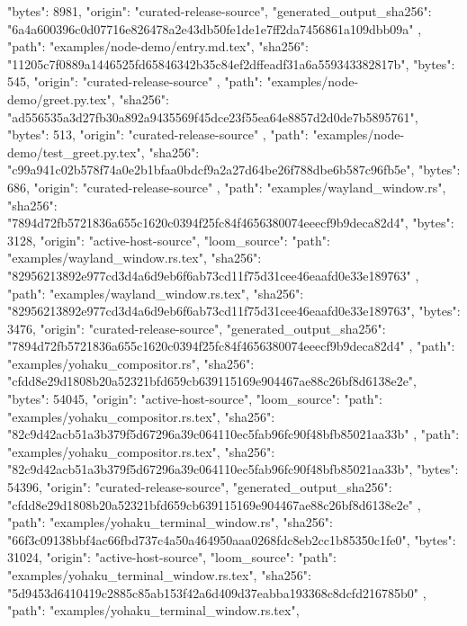 {{      "bytes": 8981,
      "origin": "curated-release-source",
      "generated_output_sha256": "6a4a600396c0d07716e826478a2e43db50fe1de1e7ff2da7456861a109dbb09a"
    },
    {
      "path": "examples/node-demo/entry.md.tex",
      "sha256": "11205c7f0889a1446525fd65846342b35c84ef2dffeadf31a6a559343382817b",
      "bytes": 545,
      "origin": "curated-release-source"
    },
    {
      "path": "examples/node-demo/greet.py.tex",
      "sha256": "ad556535a3d27fb30a892a9435569f45dce23f55ea64e8857d2d0de7b5895761",
      "bytes": 513,
      "origin": "curated-release-source"
    },
    {
      "path": "examples/node-demo/test_greet.py.tex",
      "sha256": "c99a941c02b578f74a0e2b1bfaa0bdcf9a2a27d64be26f788dbe6b587c96fb5e",
      "bytes": 686,
      "origin": "curated-release-source"
    },
    {
      "path": "examples/wayland_window.rs",
      "sha256": "7894d72fb5721836a655c1620c0394f25fc84f4656380074eeecf9b9deca82d4",
      "bytes": 3128,
      "origin": "active-host-source",
      "loom_source": {
        "path": "examples/wayland_window.rs.tex",
        "sha256": "82956213892e977cd3d4a6d9eb6f6ab73cd11f75d31cee46eaafd0e33e189763"
      }
    },
    {
      "path": "examples/wayland_window.rs.tex",
      "sha256": "82956213892e977cd3d4a6d9eb6f6ab73cd11f75d31cee46eaafd0e33e189763",
      "bytes": 3476,
      "origin": "curated-release-source",
      "generated_output_sha256": "7894d72fb5721836a655c1620c0394f25fc84f4656380074eeecf9b9deca82d4"
    },
    {
      "path": "examples/yohaku_compositor.rs",
      "sha256": "cfdd8e29d1808b20a52321bfd659cb639115169e904467ae88c26bf8d6138e2e",
      "bytes": 54045,
      "origin": "active-host-source",
      "loom_source": {
        "path": "examples/yohaku_compositor.rs.tex",
        "sha256": "82c9d42acb51a3b379f5d67296a39c064110ec5fab96fc90f48bfb85021aa33b"
      }
    },
    {
      "path": "examples/yohaku_compositor.rs.tex",
      "sha256": "82c9d42acb51a3b379f5d67296a39c064110ec5fab96fc90f48bfb85021aa33b",
      "bytes": 54396,
      "origin": "curated-release-source",
      "generated_output_sha256": "cfdd8e29d1808b20a52321bfd659cb639115169e904467ae88c26bf8d6138e2e"
    },
    {
      "path": "examples/yohaku_terminal_window.rs",
      "sha256": "66f3c09138bbf4ac66fbd737c4a50a464950aaa0268fdc8eb2cc1b85350c1fe0",
      "bytes": 31024,
      "origin": "active-host-source",
      "loom_source": {
        "path": "examples/yohaku_terminal_window.rs.tex",
        "sha256": "5d9453d6410419c2885c85ab153f42a6d409d37eabba193368c8dcfd216785b0"
      }
    },
    {
      "path": "examples/yohaku_terminal_window.rs.tex",
}}
